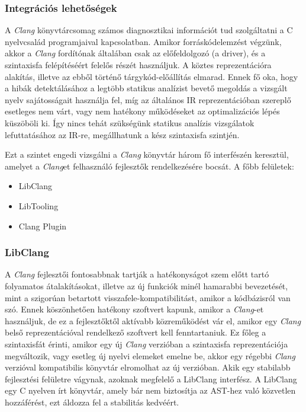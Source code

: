 \documentclass[a4paper,12pt]{report}
\begin{document}
\subsubsection{Integrációs lehetőségek}
A \emph{Clang} könyvtárcsomag számos diagnosztikai információt tud szolgáltatni a C nyelvcsalád programjaival kapcsolatban. Amikor forráskódelemzést végzünk, akkor a \emph{Clang} fordítónak általában csak az előfeldolgozó (a driver), és a szintaxisfa felépítéséért felelős részét használjuk. A köztes reprezentációra alakítás, illetve az ebből történő tárgykód-előállítás elmarad. Ennek fő oka, hogy a hibák detektálásához a legtöbb statikus analízist bevető megoldás a vizsgált nyelv sajátosságait használja fel, míg az általános IR reprezentációban szereplő esetleges nem várt, vagy nem hatékony működéseket az optimalizációs lépés küszöböli ki. Így nincs tehát szükségünk statikus analízis vizsgálatok lefuttatásához az IR-re, megállhatunk a kész szintaxisfa szintjén.

Ezt a szintet engedi vizsgálni a \emph{Clang} könyvtár három fő interfészén keresztül, amelyet a \emph{Clang}et felhasználó fejlesztők rendelkezésére bocsát. A főbb felületek:
\begin{itemize}
\item LibClang
\item LibTooling
\item Clang Plugin
\end{itemize}

\subsubsection{LibClang}
A \emph{Clang} fejlesztői fontosabbnak tartják a hatékonyságot szem előtt tartó folyamatos átalakításokat, illetve az új funkciók minél hamarabbi bevezetését, mint a szigorúan betartott visszafele-kompatibilitást, amikor a kódbázisról van szó. Ennek köszönhetően hatékony szoftvert kapunk, amikor a \emph{Clang}-et használjuk, de ez a fejlesztőktől aktívabb közreműködést vár el, amikor egy \emph{Clang} belső reprezentációval rendelkező szoftvert kell fenntartaniuk. Ez főleg a szintaxisfát érinti, amikor egy új \emph{Clang} verzióban a szintaxisfa reprezentációja megváltozik, vagy esetleg új nyelvi elemeket emelne be, akkor egy régebbi \emph{Clang} verzióval kompatibilis könyvtár elromolhat az új verzióban. Akik egy stabilabb fejlesztési felületre vágynak, azoknak megfelelő a LibClang interfész. A LibClang egy C nyelven írt könyvtár, amely bár nem biztosítja az AST-hez való közvetlen  hozzáférést, ezt áldozza fel a stabilitás kedvéért.
\end{document}
